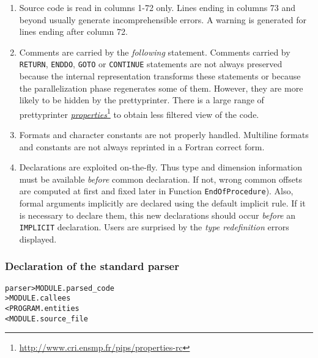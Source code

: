 \documentclass[a4paper]{report}
\newenvironment{PipsMake}{\begin{alltt}}{\end{alltt}}
\newcommand{\LINK}[2]{\href{#2}{#1}\footnote{\url{#2}}\xspace}
\newcommand{\PROPERTIES}{\LINK{\emph{properties}}{http://www.cri.ensmp.fr/pips/properties-rc}}
\begin{document}
\begin{enumerate}

  \item Source code is read in columns 1-72 only. Lines ending in columns
73 and beyond usually generate incomprehensible errors. A warning is
generated for lines ending after column 72.

\item Comments are carried by the {\em following} statement. Comments
  carried by \texttt{RETURN}, \texttt{ENDDO}, \texttt{GOTO} or
  \texttt{CONTINUE} statements are not always preserved because the
  internal representation transforms these statements or because the
  parallelization phase regenerates some of them. However, they are
  more likely to be hidden by the prettyprinter.  There is a large
  range of prettyprinter \PROPERTIES{} to obtain less filtered view of
  the code.
 
\item Formats and character constants are not properly handled. Multiline
  formats and constants are not always reprinted in a Fortran correct
  form.

\item Declarations are exploited on-the-fly. Thus type and dimension
  information must be available {\em before} common declaration. If not,
  wrong common offsets are computed at first and fixed
  later in Function \texttt{EndOfProcedure}). Also, formal arguments
  implicitly are declared using the default implicit rule. If it is
  necessary to declare them, this new declarations should occur {\em
    before} an \texttt{IMPLICIT} declaration. Users are surprised by the
  {\em type redefinition} errors displayed.


\end{enumerate}

\subsubsection{Declaration of the standard parser}

\begin{PipsMake}
parser                          > MODULE.parsed_code
                                > MODULE.callees
        < PROGRAM.entities
        < MODULE.source_file
\end{PipsMake}
\end{document}
